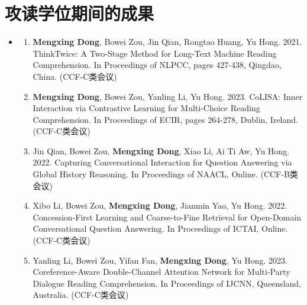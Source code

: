 \chapter{攻读学位期间的成果}

\begin{itemize}
	\setlength{\itemsep}{5pt}
	
	\item \textbf{\heiti{}}
	      \begin{enumerate}
	      	\setlength{\itemsep}{-\itemsep}  %
	      	
	      	\item \textbf{Mengxing Dong}, Bowei Zou, Jin Qian, Rongtao Huang, Yu Hong. 2021.
	      	      ThinkTwice: A Two-Stage Method for Long-Text Machine Reading Comprehension.
	      	      In Proceedings of NLPCC, pages 427-438, Qingdao, China. (CCF-C类会议)
	      	      
	      	\item \textbf{Mengxing Dong}, Bowei Zou, Yanling Li, Yu Hong. 2023.
	      	      CoLISA: Inner Interaction via Contrastive Learning for Multi-Choice Reading Comprehension.
	      	      In Proceedings of ECIR, pages 264-278, Dublin, Ireland. (CCF-C类会议)
	      	      
	      	\item Jin Qian, Bowei Zou, \textbf{Mengxing Dong}, Xiao Li, Ai Ti Aw, Yu Hong. 2022.
	      	      Capturing Conversational Interaction for Question Answering via Global History Reasoning.
	      	      In Proceedings of NAACL, Online. (CCF-B类会议)
	      	      
	      	\item Xibo Li, Bowei Zou, \textbf{Mengxing Dong}, Jianmin Yao, Yu Hong. 2022.
	      	      Concession-First Learning and Coarse-to-Fine Retrieval for Open-Domain Conversational Question Answering.
                  In Proceedings of ICTAI, Online. (CCF-C类会议)
			
			\item Yanling Li, Bowei Zou, Yifan Fan, \textbf{Mengxing Dong}, Yu Hong. 2023.
				  Coreference-Aware Double-Channel Attention Network for Multi-Party Dialogue Reading Comprehension.
				  In Proceedings of IJCNN, Queensland, Australia. (CCF-C类会议)


\end{enumerate}
\end{itemize}
